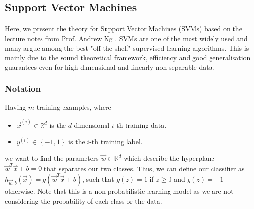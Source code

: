\subsection{Support Vector Machines}

\paragraph{}
	Here, we present the theory for Support Vector Machines (SVMs) based on the lecture notes from Prof. Andrew Ng \cite{ng13}. SVMs are one of the most widely used and many argue among the best "off-the-shelf" supervised learning algorithms. This is mainly due to the sound theoretical framework, efficiency and good generalisation guarantees even for high-dimensional and linearly non-separable data.
	
\subsubsection{Notation}
	Having $m$ training examples, where
	\begin{itemize}

  		\item $\vec{x}^{(i)} \in \mathbb{R}^d$ is the $d$-dimensional $i$-th training data.
  		\item $y^{(i)} \in \left\{-1, 1 \right\}$ is the $i$-th training label.

	\end{itemize}
we want to find the parameters $\vec{w} \in \mathbb{R}^d$ which describe the hyperplane $\vec{w}^T \vec{x} + b = 0$ that separates our two classes. Thus, we can define our classifier as $h_{\vec{w}, b}(\vec{x}) = g\left(\vec{w}^T \vec{x} + b \right)$, such that $g(z) = 1$ if $z \geq 0$ and $g(z) = -1$ otherwise. Note that this is a non-probabilistic learning model as we are not considering the probability of each class or the data.
	
